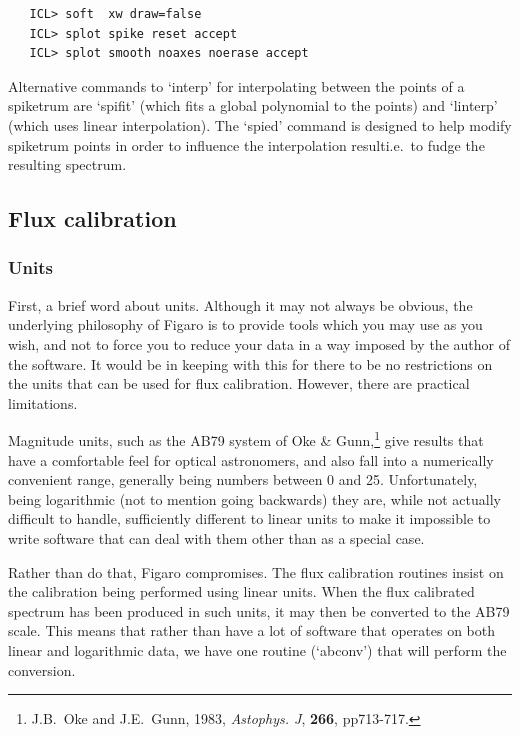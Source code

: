 \begin{verbatim}
   ICL> soft  xw draw=false
   ICL> splot spike reset accept
   ICL> splot smooth noaxes noerase accept
\end{verbatim}

   Alternative commands to `interp' for interpolating between the points
   of a spiketrum are `spifit' (which fits a global polynomial to the
   points) and `linterp' (which uses linear interpolation).  The `spied'
   command is designed to help modify spiketrum points in order to
   influence the interpolation result\latorhtm{---}{-}i.e.\ to fudge the
   resulting spectrum.


\subsection{\label{techno5}Flux calibration}


\subsubsection{\label{techno5units}Units}

   First, a brief word about units.  Although it may not always be
   obvious, the underlying philosophy of Figaro is to provide tools
   which  you may use as you wish, and not to force you to reduce your
   data in a way imposed by the author of the software.  It would be in
   keeping with this for there to be no restrictions on the units that
   can be used for flux calibration.  However, there are practical
   limitations.

   Magnitude units, such as the AB79 system of Oke \&
   Gunn,\footnote{J.B.~Oke and J.E.~Gunn, 1983, {\it Astophys. J},
   {\bf 266}, pp713-717.} give
   results that have a comfortable feel for optical astronomers, and
   also fall into a numerically convenient range, generally being
   numbers between 0 and 25.  Unfortunately, being logarithmic (not to
   mention going backwards) they are, while not actually difficult to
   handle, sufficiently different to linear units to make it impossible
   to write software that can deal with them other than as a special
   case.

   Rather than do that, Figaro compromises.  The flux calibration
   routines insist on the calibration being performed using linear
   units.  When the flux calibrated spectrum has been produced in such
   units, it may then be converted to the AB79 scale.  This means that
   rather than have a lot of software that operates on both linear and
   logarithmic data, we have one routine (`abconv') that will perform
   the conversion.


